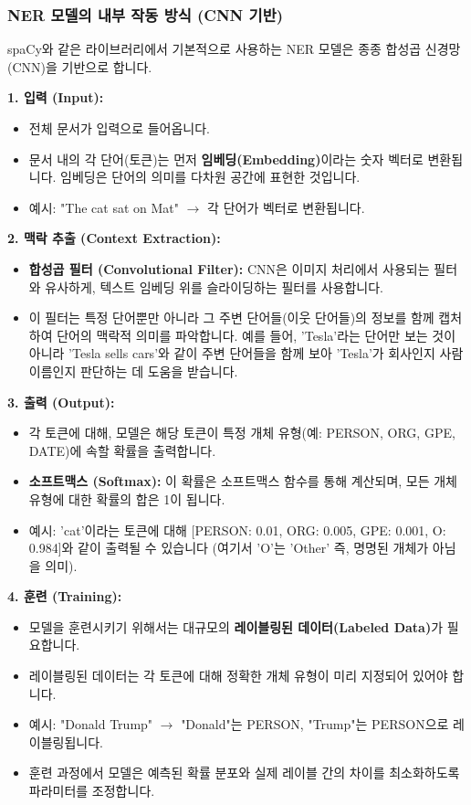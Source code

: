 \documentclass[11pt,a4paper]{article}
\begin{document}
\newpage
\subsubsection*{NER 모델의 내부 작동 방식 (CNN 기반)}
spaCy와 같은 라이브러리에서 기본적으로 사용하는 NER 모델은 종종 합성곱 신경망(CNN)을 기반으로 합니다.

\textbf{1. 입력 (Input):}
\begin{itemize}
    \item 전체 문서가 입력으로 들어옵니다.
    \item 문서 내의 각 단어(토큰)는 먼저 \textbf{임베딩(Embedding)}이라는 숫자 벡터로 변환됩니다. 임베딩은 단어의 의미를 다차원 공간에 표현한 것입니다.
    \item 예시: "The cat sat on Mat" $\rightarrow$ 각 단어가 벡터로 변환됩니다.
\end{itemize}

\textbf{2. 맥락 추출 (Context Extraction):}
\begin{itemize}
    \item \textbf{합성곱 필터 (Convolutional Filter):} CNN은 이미지 처리에서 사용되는 필터와 유사하게, 텍스트 임베딩 위를 슬라이딩하는 필터를 사용합니다.
    \item 이 필터는 특정 단어뿐만 아니라 그 주변 단어들(이웃 단어들)의 정보를 함께 캡처하여 단어의 맥락적 의미를 파악합니다. 예를 들어, 'Tesla'라는 단어만 보는 것이 아니라 'Tesla sells cars'와 같이 주변 단어들을 함께 보아 'Tesla'가 회사인지 사람 이름인지 판단하는 데 도움을 받습니다.
\end{itemize}

\textbf{3. 출력 (Output):}
\begin{itemize}
    \item 각 토큰에 대해, 모델은 해당 토큰이 특정 개체 유형(예: PERSON, ORG, GPE, DATE)에 속할 확률을 출력합니다.
    \item \textbf{소프트맥스 (Softmax):} 이 확률은 소프트맥스 함수를 통해 계산되며, 모든 개체 유형에 대한 확률의 합은 1이 됩니다.
    \item 예시: 'cat'이라는 토큰에 대해 [PERSON: 0.01, ORG: 0.005, GPE: 0.001, O: 0.984]와 같이 출력될 수 있습니다 (여기서 'O'는 'Other' 즉, 명명된 개체가 아님을 의미).
\end{itemize}

\textbf{4. 훈련 (Training):}
\begin{itemize}
    \item 모델을 훈련시키기 위해서는 대규모의 \textbf{레이블링된 데이터(Labeled Data)}가 필요합니다.
    \item 레이블링된 데이터는 각 토큰에 대해 정확한 개체 유형이 미리 지정되어 있어야 합니다.
    \item 예시: "Donald Trump" $\rightarrow$ "Donald"는 PERSON, "Trump"는 PERSON으로 레이블링됩니다.
    \item 훈련 과정에서 모델은 예측된 확률 분포와 실제 레이블 간의 차이를 최소화하도록 파라미터를 조정합니다.
\end{itemize}
\end{document}
